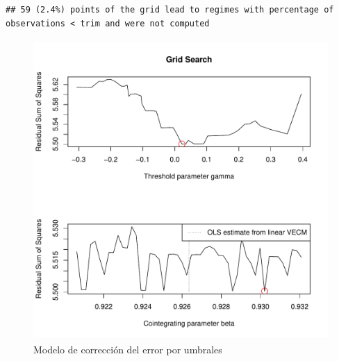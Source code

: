 \documentclass[12pt, twoside]{book}\usepackage[]{graphicx}\usepackage[]{color}
\makeatletter
\newenvironment{kframe}{%
 \def\at@end@of@kframe{}%
 \ifinner\ifhmode%
  \def\at@end@of@kframe{\end{minipage}}%
  \begin{minipage}{\columnwidth}%
 \fi\fi%
 \def\FrameCommand##1{\hskip\@totalleftmargin \hskip-\fboxsep
 \colorbox{shadecolor}{##1}\hskip-\fboxsep
     \hskip-\linewidth \hskip-\@totalleftmargin \hskip\columnwidth}%
 \MakeFramed {\advance\hsize-\width
   \@totalleftmargin\z@ \linewidth\hsize
   \@setminipage}}%
 {\par\unskip\endMakeFramed%
 \at@end@of@kframe}
\newenvironment{knitrout}{}{} %
\numberwithin{equation}{section}
\numberwithin{theorem}{section}
\numberwithin{teorema}{section}
\numberwithin{defi}{section}
\numberwithin{prop}{section}
\numberwithin{defi}{section}
\theoremstyle{plain}
\makeatother
\begin{document}
\begin{knitrout}
\color{fgcolor}\begin{kframe}
\begin{verbatim}
## 59 (2.4%) points of the grid lead to regimes with percentage of observations < trim and were not computed
\end{verbatim}
\end{kframe}\begin{figure}[H]

{\centering \includegraphics[width=4.5in,height=4.5in]{figure/fig-5-1} 

}

\caption[Modelo de corrección del error por umbrales]{Modelo de corrección del error por umbrales}\label{fig:fig-5}
\end{figure}


\end{knitrout}
\end{document}
